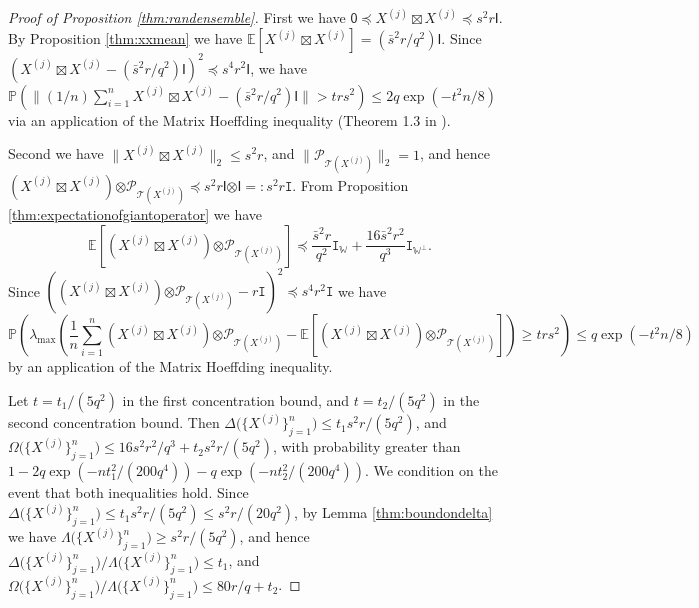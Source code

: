 \documentclass[11pt,letterpaper]{article}
\newcommand{\botimes}{\boldsymbol \otimes}
\newcommand{\ct}{\mathcal{T}}
\newcommand{\cp}{\mathcal{P}}
\newcommand{\sfi}{\mathsf{I}}
\newcommand{\bbw}{\mathbb{W}}
\newcommand{\roc}{\Omega}
\newcommand{\coveig}{\Lambda}
\newcommand{\covsup}{\Delta}
\begin{document}
\begin{proof}[Proof of Proposition \ref{thm:randensemble}]	
	First we have $\mathsf{0} \preceq X^{(j)} \boxtimes X^{(j)} \preceq s^2 r \sfi$.  By Proposition \ref{thm:xxmean} we have $\mathbb{E}[X^{(j)} \boxtimes X^{(j)}] = (\bar{s}^2 r/q^2) \sfi$.  Since $(X^{(j)} \boxtimes X^{(j)} - (\bar{s}^2 r/q^2) \sfi)^2 \preceq s^4 r^2 \sfi$, we have $ \mathbb{P} ( \|(1/n)\sum_{i=1}^{n} X^{(j)} \boxtimes X^{(j)} - (\bar{s}^2 r/q^2)\sfi \| > t r s^2 ) \leq 2q \exp(- t^2 n / 8)$ via an application of the Matrix Hoeffding inequality (Theorem 1.3 in \cite{Tro:12}).
	
	
	Second we have $\|X^{(j)} \boxtimes X^{(j)}\|_2 \leq s^2 r$, and $\| \cp_{\ct(X^{(j)})}\|_2 = 1$, and hence $(X^{(j)} \boxtimes X^{(j)}) \botimes \cp_{\ct(X^{(j)})} \preceq s^2 r \sfi \botimes \sfi =: s^2 r \mathtt{I}$. From Proposition \ref{thm:expectationofgiantoperator} we have
	\begin{equation*}
		\mathbb{E}[ (X^{(j)} \boxtimes X^{(j)}) \botimes \cp_{\ct(X^{(j)})} ] \preceq \frac{\bar{s}^2 r}{q^2} \mathtt{I}_{\bbw} + \frac{16 \bar{s}^2 r^2}{q^3} \mathtt{I}_{\bbw^{\perp}}.
	\end{equation*}
	Since $((X^{(j)} \boxtimes X^{(j)}) \botimes \cp_{\ct(X^{(j)})} - r \mathtt{I})^2 \preceq s^4 r^2 \mathtt{I}$ we have 
	\begin{equation*}
		\mathbb{P} \left( \lambda_{\max} \left( \frac{1}{n} \sum_{i=1}^{n}  (X^{(j)} \boxtimes X^{(j)}) \botimes \cp_{\ct(X^{(j)})}- \mathbb{E} [(X^{(j)} \boxtimes X^{(j)}) \botimes \cp_{\ct(X^{(j)})}] \right) \geq t r s^2 \right) \leq q \exp( - t^2 n / 8) 
	\end{equation*}
	by an application of the Matrix Hoeffding inequality.
	
	Let $t = t_1 /(5q^2)$ in the first concentration bound, and $t= t_2 / (5q^2)$ in the second concentration bound.  Then $\covsup\biggl( \bigl\{ X^{(j)} \bigr\}_{j=1}^{n}\biggr) \leq t_1 s^2 r / (5q^2)$, and $\roc\biggl( \bigl\{ X^{(j)} \bigr\}_{j=1}^{n}\biggr) \leq 16s^2 r^2/q^3 + t_2 s^2 r / (5q^2)$, with probability greater than $1- 2q\exp(-n t_1^2 / (200q^4)) - q \exp(- n t_2^2 / (200q^4))$.  We condition on the event that both inequalities hold.  Since $\covsup\biggl( \bigl\{ X^{(j)} \bigr\}_{j=1}^{n}\biggr) \leq t_1 s^2 r / (5q^2) \leq s^2 r/(20q^2)$, by Lemma \ref{thm:boundondelta} we have $\coveig\biggl( \bigl\{ X^{(j)} \bigr\}_{j=1}^{n}\biggr) \geq s^2 r/(5q^2)$, and hence $\covsup\biggl( \bigl\{ X^{(j)} \bigr\}_{j=1}^{n}\biggr) / \coveig\biggl( \bigl\{ X^{(j)} \bigr\}_{j=1}^{n}\biggr) \leq t_1$, and $\roc\biggl( \bigl\{ X^{(j)} \bigr\}_{j=1}^{n}\biggr) / \coveig\biggl( \bigl\{ X^{(j)} \bigr\}_{j=1}^{n}\biggr) \leq 80r/q + t_2$.
\end{proof}
\end{document}
